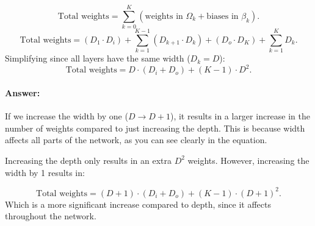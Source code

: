 \documentclass[10pt]{article}
\begin{document}
\[
\text{Total weights} = \sum_{k=0}^{K} (\text{weights in } \Omega_k + \text{biases in } \beta_k).
\]
\[
\text{Total weights} = (D_1 \cdot D_i) + \sum_{k=1}^{K-1} (D_{k+1} \cdot D_k) + (D_o \cdot D_K) + \sum_{k=1}^{K} D_k.
\]
Simplifying since all layers have the same width (\( D_k = D \)):
\[
\text{Total weights} = D \cdot (D_i + D_o) + (K - 1) \cdot D^2.
\]
\paragraph{Answer:} 
If we increase the width by one (\( D \to D+1 \)), it results in a larger increase in the number of weights compared to just increasing the depth. This is because width affects all parts of the network, as you can see clearly in the equation. 

Increasing the depth only results in an extra \( D^2 \) weights. However, increasing the width by 1 results in:

\[
\text{Total weights} = (D+1) \cdot (D_i + D_o) + (K - 1) \cdot (D+1)^2.
\]
Which is a more significant increase compared to depth, since it affects throughout the network.
\end{document}
